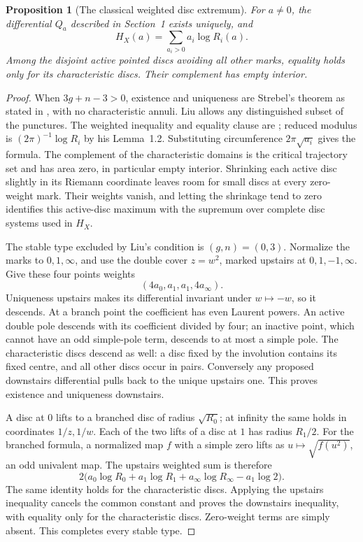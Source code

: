 \documentclass[11pt,a4paper]{article}
\newtheorem{proposition}[theorem]{Proposition}
\theoremstyle{definition}
\begin{document}
\begin{proposition}[The classical weighted disc extremum]\label{prop:strebel-support}
For $a\ne0$, the differential $Q_a$ described in Section~1 exists uniquely, and
\[
                 H_X(a)=\sum_{a_i>0}a_i\log R_i(a).
\]
Among the disjoint active pointed discs avoiding all other marks, equality holds only for its characteristic discs. Their complement has empty interior.
\end{proposition}
\begin{proof}
When $3g+n-3>0$, existence and uniqueness are Strebel's theorem as stated in \cite[Theorem~3.4, p.~226]{Liu}, with no characteristic annuli. Liu allows any distinguished subset of the punctures. The weighted inequality and equality clause are \cite[Lemma~1.7, pp.~218--219]{Liu}; reduced modulus is $(2\pi)^{-1}\log R_i$ by his Lemma~1.2. Substituting circumference $2\pi\sqrt{a_i}$ gives the formula. The complement of the characteristic domains is the critical trajectory set and has area zero, in particular empty interior. Shrinking each active disc slightly in its Riemann coordinate leaves room for small discs at every zero-weight mark. Their weights vanish, and letting the shrinkage tend to zero identifies this active-disc maximum with the supremum over complete disc systems used in $H_X$.

The stable type excluded by Liu's condition is $(g,n)=(0,3)$. Normalize the marks to $0,1,\infty$, and use the double cover $z=w^2$, marked upstairs at $0,1,-1,\infty$. Give these four points weights
\[
                    (4a_0,a_1,a_1,4a_\infty).
\]
Uniqueness upstairs makes its differential invariant under $w\mapsto-w$, so it descends. At a branch point the coefficient has even Laurent powers. An active double pole descends with its coefficient divided by four; an inactive point, which cannot have an odd simple-pole term, descends to at most a simple pole. The characteristic discs descend as well: a disc fixed by the involution contains its fixed centre, and all other discs occur in pairs. Conversely any proposed downstairs differential pulls back to the unique upstairs one. This proves existence and uniqueness downstairs.

A disc at $0$ lifts to a branched disc of radius $\sqrt{R_0}$; at infinity the same holds in coordinates $1/z,1/w$. Each of the two lifts of a disc at $1$ has radius $R_1/2$. For the branched formula, a normalized map $f$ with a simple zero lifts as $u\mapsto\sqrt{f(u^2)}$, an odd univalent map. The upstairs weighted sum is therefore
\[
 2\bigl(a_0\log R_0+a_1\log R_1+a_\infty\log R_\infty
                       -a_1\log2\bigr).
\]
The same identity holds for the characteristic discs. Applying the upstairs inequality cancels the common constant and proves the downstairs inequality, with equality only for the characteristic discs. Zero-weight terms are simply absent. This completes every stable type.
\end{proof}
\end{document}
